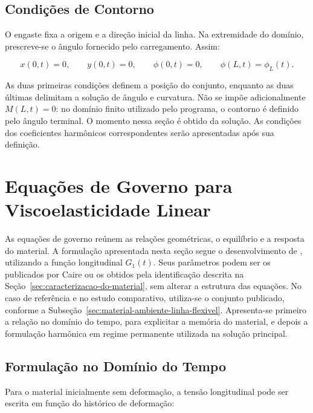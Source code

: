 \documentclass[arial,centeredequations,english,brazilian,oneside,section=TITLE]{ifes8}
\begin{document}
\subsection{Condições de Contorno}
\label{sec:condicoes-contorno}

O engaste fixa a origem e a direção inicial da linha. Na extremidade do domínio,
prescreve-se o ângulo fornecido pelo carregamento. Assim:

\begin{equation}
  x(0,t)=0,\qquad y(0,t)=0,\qquad
  \phi(0,t)=0,\qquad \phi(L,t)=\phi_L(t).
  \label{eq:contorno-geometrico-metodologia}
\end{equation}

As duas primeiras condições definem a posição do conjunto, enquanto as duas
últimas delimitam a solução de ângulo e curvatura. Não se impõe adicionalmente
$M(L,t)=0$: no domínio finito utilizado pelo programa, o contorno é definido
pelo ângulo terminal. O momento nessa seção é obtido da solução. As condições
dos coeficientes harmônicos correspondentes serão apresentadas após sua definição.

\section{Equações de Governo para Viscoelasticidade Linear}
\label{sec:implementando-viscoelasticidade}

As equações de governo reúnem as relações geométricas, o equilíbrio e a resposta
do material. A formulação apresentada nesta seção segue o desenvolvimento de
, utilizando a função longitudinal $G_1(t)$.
Seus parâmetros podem ser os publicados por Caire ou os obtidos pela identificação
descrita na Seção~\ref{sec:caracterizacao-do-material}, sem alterar a estrutura
das equações. No caso de referência e no estudo comparativo, utiliza-se o conjunto
publicado, conforme a Subseção~\ref{sec:material-ambiente-linha-flexivel}. Apresenta-se primeiro
a relação no domínio do tempo, para explicitar a memória do material, e depois
a formulação harmônica em regime permanente utilizada na solução principal.

\subsection{Formulação no Domínio do Tempo}
\label{sec:governo-linear-tempo}

Para o material inicialmente sem deformação, a tensão longitudinal pode ser
escrita em função do histórico de deformação:
\end{document}
